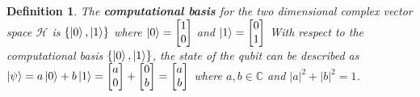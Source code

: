 \documentclass[12pt,twoside,fleqn]{report}
\theoremstyle{thmstyle}
\newtheorem{defn}{Definition}[chapter]
\begin{document}
\begin{defn}
The \textbf{computational basis} for the two dimensional complex vector space $\mathcal{H}$ is $\{ \ket{0}, \ket{1} \}$ where $\ket{0} = \begin{bmatrix} 1 \\ 0 \end{bmatrix}$ and $\ket{1} = \begin{bmatrix} 0 \\ 1 \end{bmatrix}$
With respect to the computational basis $\{ \ket{0}, \ket{1} \}$, the state of the qubit can be described as \\ $\ket{\psi} = a \ket{0} + b \ket{1} = \begin{bmatrix} a \\ 0 \end{bmatrix} + \begin{bmatrix} 0 \\ b \end{bmatrix} = \begin{bmatrix} a \\ b \end{bmatrix} $ where $a, b \in \mathbb{C}$ and $|a|^2 + |b|^2 = 1$.
\end{defn}
\end{document}
